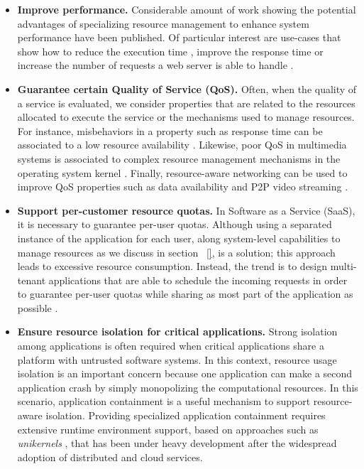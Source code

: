 \begin{itemize}
\item \textbf{Improve performance.}
Considerable amount of work showing the potential advantages of specializing resource management to enhance system performance have been published.
Of particular interest are use-cases that show how to reduce the execution time \cite{Polo:2011:RAS:2414338.2414352}, improve the response time \cite{no se} or increase the number of requests a web server is able to handle \cite{engler1995exokernel,Belay:2014:IPD:2685048.2685053}.

\item \textbf{Guarantee certain Quality of Service (QoS).} 
Often, when the quality of a service is evaluated, we consider properties that are related to the resources allocated to execute the service or the mechanisms used to manage resources.
For instance, misbehaviors in a property such as response time can be associated to a low resource availability \cite{uno aquji,Chechik-2009}.
Likewise, poor QoS in multimedia systems is associated to complex resource management mechanisms in the operating system kernel \cite{Black1997}.
Finally, resource-aware networking can be used to improve QoS properties such as data availability \cite{Boldrini:2008:CRA:1549824.1550106} and P2P video streaming \cite{Pianese:2007:RLA:1326320.1326323,Alhaisoni:2010:RTO:1664767.1664770}.

\item \textbf{Support per-customer resource quotas.}
In Software as a Service (SaaS), it is necessary to guarantee per-user quotas.
Although using a separated instance of the application for each user, along system-level capabilities to manage resources as we discuss in section ~\ref{}, is a solution; this approach leads to excessive resource consumption.
Instead, the trend is to design multi-tenant applications that are able to schedule the incoming requests in order to guarantee per-user quotas while sharing as most part of the application as possible \cite{KrSpAhKo2014_CCGrid_ResourceIsolation,KrWeKo2013-icwe-MTBenchmark}.    

\item \textbf{Ensure resource isolation for critical applications.}
Strong isolation among applications is often required when critical applications \cite{Knight:2002:SCS:581339.581406} share a platform with untrusted software systems.
In this context, resource usage isolation is an important concern because one application can make a second application crash by simply monopolizing the computational resources.
In this scenario, application containment \cite{Kamp00jails:confining,Soltesz:2007:COS:1272998.1273025,Madhavapeddy:2015:JJS:2789770.2789809} is a useful mechanism to support resource-aware isolation.
Providing specialized application containment requires extensive runtime environment support, based on approaches such as \textit{unikernels} \cite{Madhavapeddy:2013:ULO:2499368.2451167,Kivity:2014:OVO:2643634.2643642}, that has been under heavy development after the widespread adoption of distributed and cloud services.  

\end{itemize}

